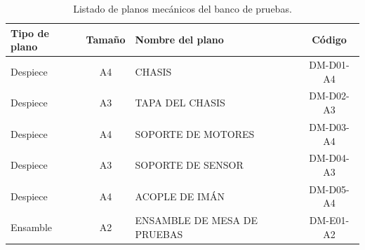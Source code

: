 \begin{table}[H]
\centering
\caption{Listado de planos mecánicos del banco de pruebas.}
\label{tab:planos_mecanicos}
\begin{tabular}{|l|c|l|c|}
\hline
Tipo de plano & Tamaño & Nombre del plano & Código \\
\hline
Despiece & A4 & CHASIS & DM-D01-A4 \\
\hline
Despiece & A3 & TAPA DEL CHASIS & DM-D02-A3 \\
\hline
Despiece & A4 & SOPORTE DE MOTORES & DM-D03-A4 \\
\hline
Despiece & A3 & SOPORTE DE SENSOR & DM-D04-A3 \\
\hline
Despiece & A4 & ACOPLE DE IMÁN & DM-D05-A4 \\
\hline
Ensamble & A2 & ENSAMBLE DE MESA DE PRUEBAS & DM-E01-A2 \\
\hline
\end{tabular}
\end{table}